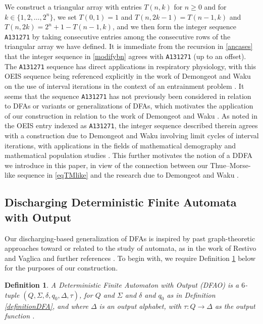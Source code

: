 \documentclass[12pt]{article}
\newtheorem{definition}{Definition}
\begin{document}
 We construct a triangular array with entries $T(n, k)$ for $n \geq 0$ and for $k \in \{ 1, 2, \ldots, 2^{n} \}$, we set $T(0, 1) = 1$ 
 and $T(n, 2k-1) = T(n-1, k)$ and $T(n, 2k) = 2^{n} + 1 - T(n - 1, k)$, and we then form the integer sequence {\tt A131271} by taking 
 consecutive entries among the consecutive rows of the triangular array we have defined. It is immediate from the recursion in 
 \eqref{ancases} that the integer sequence in \eqref{modifybn} agrees with {\tt A131271} (up to an offset). The {\tt A131271} 
 sequence has direct applications in respiratory physiology, with this OEIS sequence being referenced explicitly in the work of 
 Demongeot and Waku on the use of interval iterations in the context of an entrainment problem \cite{DemongeotWaku2009}. 
 It seems that the sequence {\tt A131271} has not previously been considered in relation 
 to DFAs or variants or generalizations of DFAs, which motivates the application of our construction 
 in relation to the work of Demongeot and Waku \cite{DemongeotWaku2009}. 
 As noted in the OEIS entry indexed as {\tt A131271}, 
 the integer sequence described therein agrees with a construction due to 
 Demongeot and Waku \cite{DemongeotWaku2009} involving limit cycles of interval iterations, 
 with applications in the fields of 
 mathematical demography and mathematical population studies \cite{DemongeotWaku2005}. 
 This further motivates the notion of a DDFA we introduce in this paper, 
 in view of the connection between our Thue--Morse-like sequence in 
 \eqref{eqTMlike} and the research due to 
 Demongeot and Waku \cite{DemongeotWaku2009,DemongeotWaku2005}. 

\subsection{Discharging Deterministic Finite Automata with Output}
 Our discharging-based generalization of DFAs 
 is inspired by past graph-theoretic approaches toward or related to the study of automata, 
 as in the work of Restivo and Vaglica \cite{RestivoVaglica2012} and 
 further references 
 \cite{BrandenburgSkodinis2005,FraigniaudIlcinkasPeerPelcPeleg2005,Gruber2012,Kelarev2004,KonitzerSimon2017}. 
 To begin with, we require Definition \ref{definitionDFAO} below for the purposes of our construction. 

\begin{definition}\label{definitionDFAO}
 A \emph{Deterministic Finite Automaton with Output} (DFAO) 
 is a $6$-tuple $(Q, \Sigma, \delta, q_0, \Delta, \tau)$, 
 for $Q$ and $\Sigma$ and $\delta$ and $q_0$ as in Definition \ref{definitionDFA}, 
 and where $\Delta$ is an \emph{output alphabet}, with $\tau\colon Q \to \Delta$ as the 
 \emph{output function} \cite[p.\ 138]{AlloucheShallit2003}. 
\end{definition}
\end{document}
